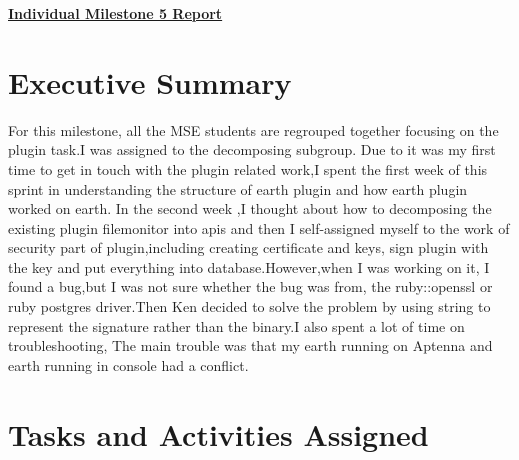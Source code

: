 \documentclass{article}
\begin{document}
\pagestyle{headings}

\begin{center}
{\LARGE\textbf{\underline{{Individual Milestone 5 Report}}}}
\end{center}

\section*{Executive Summary}
For this milestone, all the MSE students are regrouped together focusing on the plugin task.I was assigned to the decomposing subgroup. Due to it was my first time to get in touch with the plugin related work,I spent the first week of this sprint in understanding the structure of earth plugin and how earth plugin worked on earth.
In the second week ,I thought about how to decomposing the existing plugin filemonitor into apis and then I self-assigned myself to the work of security part of plugin,including creating certificate and keys, sign plugin with the key and put everything into database.However,when I was working on it, I found a bug,but I was not sure whether the bug was from, the ruby::openssl or ruby postgres driver.Then Ken decided to solve the problem by using string to represent the signature rather than the binary.I also spent a lot of time on troubleshooting, The main trouble was that my earth running on Aptenna and earth running in console had a conflict.

\section*{Tasks and Activities Assigned}
\end{document}
